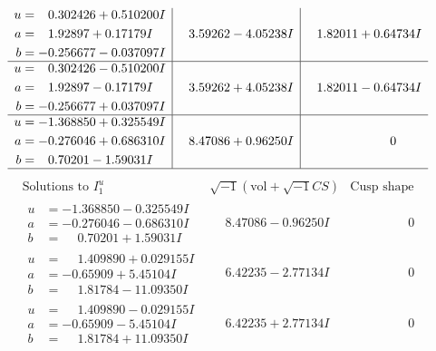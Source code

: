 \documentclass[1p]{elsarticle_modified}
\theoremstyle{definition}
\newcommand{\I}{\sqrt{-1}}
\begin{document}
$$\begin{array}{c|c|c}
\begin{aligned}
u &= \phantom{-}0.302426 + 0.510200 I \\
a &= \phantom{-}1.92897 + 0.17179 I \\
b &= -0.256677 - 0.037097 I\end{aligned}
 & \phantom{-}3.59262 - 4.05238 I & \phantom{-}1.82011 + 0.64734 I \\ \hline\begin{aligned}
u &= \phantom{-}0.302426 - 0.510200 I \\
a &= \phantom{-}1.92897 - 0.17179 I \\
b &= -0.256677 + 0.037097 I\end{aligned}
 & \phantom{-}3.59262 + 4.05238 I & \phantom{-}1.82011 - 0.64734 I \\ \hline\begin{aligned}
u &= -1.368850 + 0.325549 I \\
a &= -0.276046 + 0.686310 I \\
b &= \phantom{-}0.70201 - 1.59031 I\end{aligned}
 & \phantom{-}8.47086 + 0.96250 I & \phantom{-0.000000 } 0\\
 \hline 
 \end{array}$$\newpage$$\begin{array}{c|c|c}  
\text{Solutions to }I^u_{1}& \I (\text{vol} + \sqrt{-1}CS) & \text{Cusp shape}\\
 \hline 
\begin{aligned}
u &= -1.368850 - 0.325549 I \\
a &= -0.276046 - 0.686310 I \\
b &= \phantom{-}0.70201 + 1.59031 I\end{aligned}
 & \phantom{-}8.47086 - 0.96250 I & \phantom{-0.000000 } 0 \\ \hline\begin{aligned}
u &= \phantom{-}1.409890 + 0.029155 I \\
a &= -0.65909 + 5.45104 I \\
b &= \phantom{-}1.81784 - 11.09350 I\end{aligned}
 & \phantom{-}6.42235 - 2.77134 I & \phantom{-0.000000 } 0 \\ \hline\begin{aligned}
u &= \phantom{-}1.409890 - 0.029155 I \\
a &= -0.65909 - 5.45104 I \\
b &= \phantom{-}1.81784 + 11.09350 I\end{aligned}
 & \phantom{-}6.42235 + 2.77134 I & \phantom{-0.000000 } 0 \\ \hline\begin{aligned}

\end{aligned}
\end{array}$$
\end{document}
